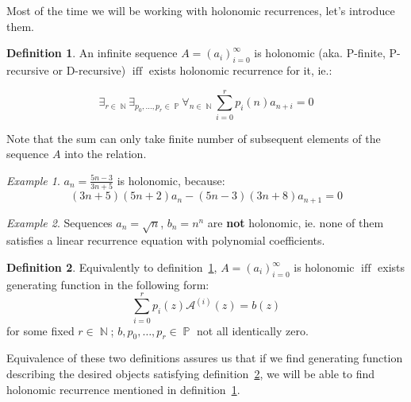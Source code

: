 \documentclass[final]{article}
\theoremstyle{definition}
\newtheorem{definition}{Definition}[subsection]
\theoremstyle{remark}
\newtheorem{example}{Example}[subsection]
\newcommand{\gf}[1]{\ensuremath{\mathcal{#1}}}
\DeclareMathOperator{\textiff}{\text{iff}}
\DeclareMathOperator{\N}{\mathbb{N}}
\DeclareMathOperator{\poly}{\mathbb{P}}
\begin{document}
Most of the time we will be working with holonomic recurrences, let's introduce them.

\begin{definition}
    \label{def:holo_1}
    \cite{holotoolkit}
    An infinite sequence \(A = (a_i)_{i=0}^{\infty}\) is holonomic (aka. P-finite, P-recursive or D-recursive) \(\textiff\) exists holonomic recurrence for it, ie.:

\[\exists_{r \in \N} \exists_{p_0, \ldots, p_r \in \poly} \forall_{n \in \N} \sum_{i=0}^r p_i(n)a_{n+i} = 0\]
\end{definition}

Note that the sum can only take finite number of subsequent elements of the sequence \(A\) into the relation.

\begin{example}
    \(a_n = \frac{5n - 3}{3n + 5}\) is holonomic, because:
    \[(3n + 5)(5n + 2) a_n - (5n - 3)(3n + 8) a_{n+1} = 0\]
\end{example}

\begin{example}
    Sequences \(a_n = \sqrt{n}\), \(b_n = n^n\) are \textbf{not} holonomic, ie. none of them satisfies a linear recurrence equation with polynomial coefficients\cite{nonholo}.
\end{example}

\begin{definition}
    \label{def:holo_2}
    \cite{complexity}
    Equivalently to definition\ \ref{def:holo_1}, \(A = (a_i)_{i=0}^{\infty}\) is holonomic \(\textiff\) exists generating function in the following form:
    \[\sum_{i=0}^{r} p_i(z) \gf{A}^{(i)}(z) = b(z)\]
    for some fixed \(r \in \N\); \(b, p_0, \ldots, p_r \in \poly\) not all identically zero.
\end{definition}

Equivalence of these two definitions assures us that if we find generating function describing the desired objects satisfying definition\ \ref{def:holo_2}, we will be able to find holonomic recurrence mentioned in definition\ \ref{def:holo_1}.\cite{complexity}
\end{document}
